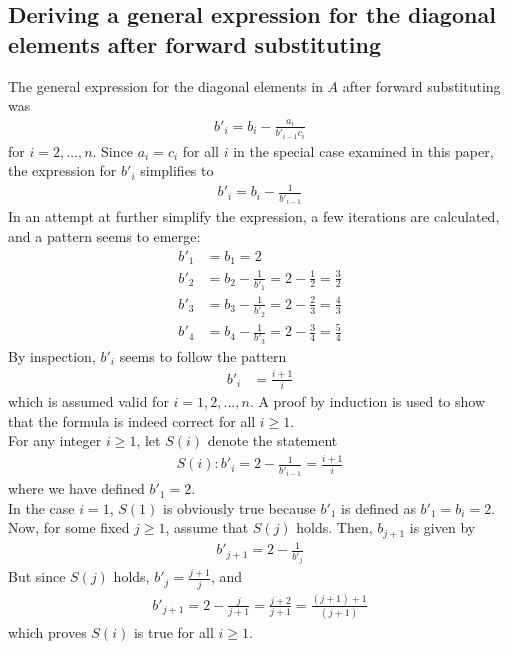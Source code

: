 \documentclass[a4paper,11pt, english, twoside]{article}
\begin{document}
\subsection{Deriving a general expression for the diagonal elements after forward substituting}
The general expression for the diagonal elements in $A$ after forward substituting was
\begin{align*}
  b'_i = b_i - \frac{a_i}{b'_{i-1} c_i}
\end{align*}
for $i = 2, \hdots, n$. Since $a_i = c_i$ for all $i$ in the special case examined in this paper,
 the expression for $b'_i$ simplifies to
\begin{align*}
  b'_i = b_i - \frac{1}{b'_{i-1}}
\end{align*}
In an attempt at further simplify the expression, a few iterations are calculated, and
a pattern seems to emerge:
\begin{align*}
  b'_1 &= b_1 = 2\\
  b'_2 &= b_2 - \frac{1}{b'_1} = 2 - \frac{1}{2} = \frac{3}{2}\\
  b'_3 &= b_3 - \frac{1}{b'_2} = 2 - \frac{2}{3} = \frac{4}{3}\\
  b'_4 &= b_4 - \frac{1}{b'_3} = 2 - \frac{3}{4} = \frac{5}{4}
\end{align*}
By inspection, $b'_i$ seems to follow the pattern
\begin{align*}
  b'_i &= \frac{i+1}{i}
\end{align*}
which is assumed valid for $i = 1,2,\hdots,n$. A proof by induction is used to
show that the formula is indeed correct for all $i \geq 1$.
\\[12pt]
For any integer $i \geq 1$, let $S(i)$ denote the statement
\begin{align*}
  S(i): b'_i = 2 - \frac{1}{b'_{i-1}} = \frac{i+1}{i}
\end{align*}
where we have defined $b'_{1} = 2$.
\\[12pt]
In the case $i = 1$, $S(1)$ is obviously true because $b'_1$ is defined as $b'_1 = b_i = 2$.
Now, for some fixed $j \geq 1$, assume that $S(j)$ holds. Then, $b_{j+1}$ is given by
\begin{align*}
  b'_{j+1} = 2 - \frac{1}{b'_j}
\end{align*}
But since $S(j)$ holds, $b'_j = \frac{j+1}{j}$, and
\begin{align*}
  b'_{j+1} = 2 - \frac{j}{j+1} = \frac{j+2}{j+1} = \frac{(j+1) + 1}{(j+1)}
\end{align*}
which proves $S(i)$ is true for all $i \geq 1$.
\end{document}

